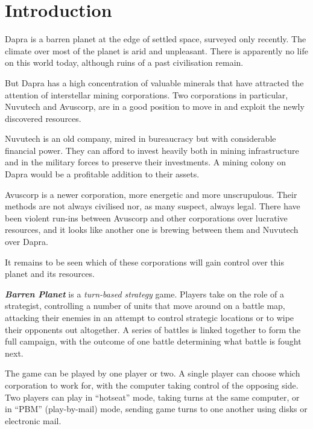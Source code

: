 %
%
%

\chapter{Introduction}

\noindent
Dapra is a barren planet at the edge of settled space, surveyed only recently. The climate over most of the planet is arid and unpleasant. There is apparently no life on this world today, although ruins of a past civilisation remain. 

But Dapra has a high concentration of valuable minerals that have attracted the attention of interstellar mining corporations. Two corporations in particular, Nuvutech and Avuscorp, are in a good position to move in and exploit the newly discovered resources.

Nuvutech is an old company, mired in bureaucracy but with considerable financial power. They can afford to invest heavily both in mining infrastructure and in the military forces to preserve their investments. A mining colony on Dapra would be a profitable addition to their assets.

Avuscorp is a newer corporation, more energetic and more unscrupulous. Their methods are not always civilised nor, as many suspect, always legal. There have been violent run-ins between Avuscorp and other corporations over lucrative resources, and it looks like another one is brewing between them and Nuvutech over Dapra.

It remains to be seen which of these corporations will gain control over this planet and its resources.

{\bf \it Barren Planet} is a {\it turn-based strategy} game. Players take on the role of a strategist, controlling a number of units that move around on a battle map, attacking their enemies in an attempt to control strategic locations or to wipe their opponents out altogether. A series of battles is linked together to form the full campaign, with the outcome of one battle determining what battle is fought next.

The game can be played by one player or two. A single player can choose which corporation to work for, with the computer taking control of the opposing side. Two players can play in ``hotseat'' mode, taking turns at the same computer, or in ``PBM'' (play-by-mail) mode, sending game turns to one another using disks or electronic mail.

